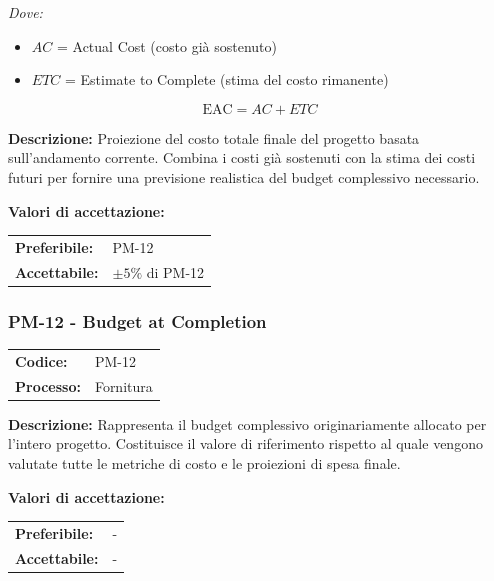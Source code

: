 \documentclass[a4paper,11pt,oneside]{scrartcl}
\begin{document}
\noindent\textit{Dove:}
\begin{itemize}[leftmargin=1.5cm, topsep=0pt, itemsep=0pt]
    \item $AC$ = Actual Cost (costo già sostenuto)
    \item $ETC$ = Estimate to Complete (stima del costo rimanente)
\end{itemize}

\[
\text{EAC} = AC + ETC
\]

\noindent\textbf{Descrizione:} Proiezione del costo totale finale del progetto basata sull'andamento corrente. Combina i costi già sostenuti con la stima dei costi futuri per fornire una previsione realistica del budget complessivo necessario.

\vspace{0.2cm}
\noindent\textbf{Valori di accettazione:}
\vspace{0.1cm}

\noindent
\begin{tabular}{@{}ll@{}}
\textbf{Preferibile:} & PM-12 \\
\textbf{Accettabile:} & $\pm 5\%$ di PM-12 \\
\end{tabular}

\subsubsection{PM-12 - Budget at Completion}

\noindent
\begin{tabular}{@{}p{}p{}@{}}
\textbf{Codice:} & PM-12 \\
\textbf{Processo:} & Fornitura \\
\end{tabular}

\vspace{0.3cm}
\noindent\textbf{Descrizione:} Rappresenta il budget complessivo originariamente allocato per l'intero progetto. Costituisce il valore di riferimento rispetto al quale vengono valutate tutte le metriche di costo e le proiezioni di spesa finale.

\vspace{0.2cm}
\noindent\textbf{Valori di accettazione:}
\vspace{0.1cm}

\noindent
\begin{tabular}{@{}ll@{}}
\textbf{Preferibile:} & - \\
\textbf{Accettabile:} & - \\
\end{tabular}
\end{document}
